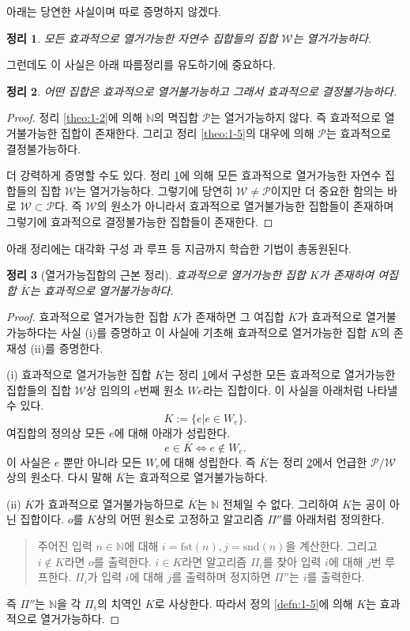 \documentclass[a4paper,chapter,atbegshi]{oblivoir}
\newtheorem{theo}{정리}[chapter]
\begin{document}
아래는 당연한 사실이며 따로 증명하지 않겠다.
\begin{theo}\label{theo:1-8}
  모든 효과적으로 열거가능한 자연수 집합들의 집합 $\mathcal{W}$는 열거가능하다.
\end{theo}
그런데도 이 사실은 아래 따름정리를 유도하기에 중요하다.
\begin{theo}\label{theo:1-9}
  어떤 집합은 효과적으로 열거불가능하고 그래서 효과적으로 결정불가능하다.
\end{theo}
\begin{proof}
  정리 \ref{theo:1-2}에 의해 $\mathbb{N}$의 멱집합 $\mathcal{P}$는 열거가능하지
  않다. 즉 효과적으로 열거불가능한 집합이 존재한다. 그리고 정리 \ref{theo:1-5}의
  대우에 의해 $\mathcal{P}$는 효과적으로 결정불가능하다. 

  더 강력하게 증명할 수도 있다. 정리 \ref{theo:1-8}에 의해 모든 효과적으로
  열거가능한 자연수 집합들의 집합 $\mathcal{W}$는 열거가능하다. 그렇기에
  당연히 $\mathcal{W}\neq\mathcal{P}$이지만 더 중요한 함의는 바로 $\mathcal{W}
  \subset\mathcal{P}$다. 즉 $\mathcal{W}$의 원소가 아니라서 효과적으로 
  열거불가능한 집합들이 존재하며 그렇기에 효과적으로 결정불가능한 집합들이
  존재한다.
\end{proof}
아래 정리에는 대각화 구성 과 루프 등 지금까지 학습한 기법이 총동원된다. 
\begin{theo}[열거가능집합의 근본 정리]\label{theo:1-10}
  효과적으로 열거가능한 집합 $K$가 존재하여 여집합 $\overline{K}$는
  효과적으로 열거불가능하다.
\end{theo}
\begin{proof}
    효과적으로 열거가능한 집합 $K$가 존재하면 그 여집합 $\overline{K}$가
    효과적으로 열거불가능하다는 사실 (i)를 증명하고 이 사실에 기초해 효과적으로
    열거가능한 집합 $K$의 존재성 (ii)를 증명한다.

  (i) 
  효과적으로 열거가능한 집합 $K$는 정리 \ref{theo:1-8}에서 구성한 모든 효과적으로
  열거가능한 집합들의 집합 $\mathcal{W}$상 임의의 $e$번째 원소 $We$라는 집합이다.
  이 사실을 아래처럼 나타낼 수 있다. 
  \[
    K:=\{e|e\in W_e\}.
  \]
  여집합의 정의상 모든 $e$에 대해 아래가 성립한다.
  \[
    e\in\overline{K}\iff e\notin W_e.
  \]
  이 사실은 $e$ 뿐만 아니라 모든 $W_e$에 대해 성립한다. 즉 $\overline{K}$는
  정리 \ref{theo:1-9}에서 언급한 $\mathcal{P}/\mathcal{W}$상의 원소다. 
  다시 말해 $\overline{K}$는 효과적으로 열거불가능하다.

  (ii)
  $\overline{K}$가 효과적으로 열거불가능하므로 $\overline{K}$는 $\mathbb{N}$
  전체일 수 없다. 그리하여 $K$는 공이 아닌 집합이다. $o$를 $K$상의 어떤
  원소로 고정하고 알고리즘 $\Pi''$를 아래처럼 정의한다.
  \begin{quote}
    주어진 입력 $n\in\mathbb{N}$에 대해 $i=\textrm{fst}(n),j=\textrm{snd}(n)$을
    계산한다. 그리고 $i\notin K$라면 $o$를 출력한다. 
    $i\in K$라면 알고리즘 $\Pi_i$를 찾아 입력 $i$에 대해 $j$번 루프한다.
    $\Pi_i$가 입력 $i$에 대해 $j$를 출력하며 정지하면
    $\Pi''$는 $i$를 출력한다.
  \end{quote}
  즉 $\Pi''$는 $\mathbb{N}$을 각 $\Pi_i$의 치역인 $K$로 사상한다. 
  따라서 정의 \ref{defn:1-5}에 의해 $K$는 효과적으로 열거가능하다.
\end{proof}
\end{document}
